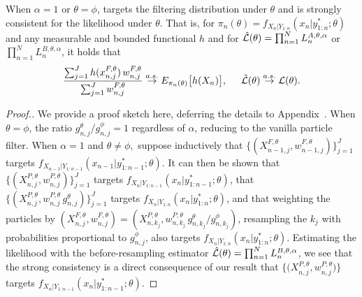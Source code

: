 \begin{thm}
    \label{thm:mop-targeting}
    When $\alpha=1$ or $\theta=\phi$,  targets the filtering distribution under $\theta$ and is strongly consistent for the likelihood under $\theta$. That is, for $\pi_n(\theta)=f_{X_{n}|Y_{1:n}}(x_n|y_{1:n}^* ; \theta)$ and any measurable and bounded functional $h$ and for $\hat{\mathcal{L}}(\theta) = \prod_{n=1}^N L_n^{A,\theta,\alpha}$ or $\prod_{n=1}^N L_n^{B,\theta,\alpha}$, it holds that
    \arxiv{}{\vspace*{-1.5mm}}
    \begin{equation} \nonumber
        \frac{\sum_{j=1}^J h(x_{n,j}^{F, \theta}) \, w_{n,j}^{F,\theta}}{\sum_{j=1}^J w_{n,j}^{F,\theta}} \stackrel{a.s.}{\to} E_{\pi_n(\theta)} \big[h(X_n)\big], \hspace{5mm} \hat\lik(\theta)  \stackrel{a.s.}{\to} \lik(\theta).
    \arxiv{}{\vspace*{-1.5mm}}
    \end{equation}
\end{thm}

\begin{proof}[Proof.]
    We provide a proof sketch here, deferring the details to Appendix~\suppSecProofTriangularArrays. 
    When $\theta=\phi$, the ratio ${g_{n,j}^\theta}/{g_{n,j}^\phi}=1$ regardless of $\alpha$, reducing to the vanilla particle filter.
    When $\alpha=1$ and $\theta\neq\phi,$ suppose inductively that $\{(X^{F,\theta}_{n-1,j},w^{F,\theta}_{n-1,j})\}_{j=1}^J$ targets $f_{X_{n-1}|Y_{1:n-1}}(x_{n-1}|y^*_{1:n-1};\theta)$.
    It can then be shown that $\{(X^{P,\theta}_{n,j},w^{P,\theta}_{n,j})\}_{j=1}^J$ targets $f_{X_{n}|Y_{1:n-1}}(x_{n}|y^*_{1:n-1};\theta)$, that $\{(X^{P,\theta}_{n,j},w^{P,\theta}_{n,j} \, g^\theta_{n,j} )\}_{j=1}^J$ targets  $f_{X_{n}|Y_{1:n}}(x_{n}|y^*_{1:n};\theta)$, and that weighting the particles by $(X^{F,\theta}_{n,j},w^{F,\theta}_{n,j}) = (X^{P,\theta}_{n,k_j}, w^{P,\theta}_{n,k_j} \, g^\theta_{n,k_j} \big/ g^\phi_{n,k_j})$,
    resampling the $k_j$ with probabilities proportional to $g^\phi_{n,j}$, also targets $f_{X_{n}|Y_{1:n}}(x_{n}|y^*_{1:n};\theta)$.
    Estimating the likelihood with the before-resampling estimator $\hat{\mathcal{L}}(\theta) = \prod_{n=1}^N L_n^{B,\theta,\alpha}$, we see that the strong consistency is a direct consequence of our result that $\{ \big(X^{P,\theta}_{n,j},w^{P,\theta}_{n,j}\big) \}$ targets $f_{X_{n}|Y_{1:n-1}}(x_{n}|y^*_{1:n-1};\theta)$. 
\end{proof}


